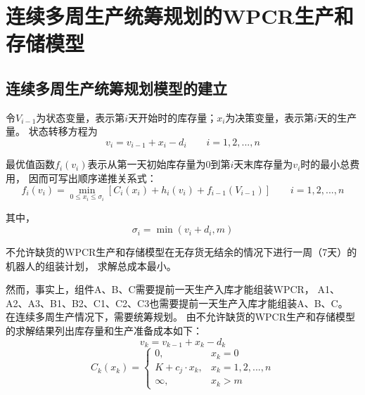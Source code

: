 %
%
%
%
%

\chapter{连续多周生产统筹规划的WPCR生产和存储模型}

\section{连续多周生产统筹规划模型的建立}

令$V_{i-1}$为状态变量，表示第$i$天开始时的库存量；$x_i$为决策变量，表示第$i$天的生产量。
状态转移方程为
\begin{equation*}
    v_i=v_{i-1}+x_i-d_i \qquad i=1,2,...,n
\end{equation*}

最优值函数$f_i(v_i)$表示从第一天初始库存量为$0$到第$i$天末库存量为$v_i$时的最小总费用，
因而可写出顺序递推关系式\cite{韩中庚2007实用运筹学模型}：
\begin{equation}
    f_i(v_i)=\mathop{\min}_{0\leq x_i \leq \sigma_i}[C_i(x_i)+h_i(v_i)+f_{i-1}(V_{i-1})] \qquad i=1,2,...,n
\end{equation}

其中，
\begin{equation}
    \sigma_i=\min(v_i+d_i,m)
\end{equation}

不允许缺货的WPCR生产和存储模型在无存货无结余的情况下进行一周（7天）的机器人的组装计划，
求解总成本最小。

然而，事实上，组件A、B、C需要提前一天生产入库才能组装WPCR，
A1、A2、A3、B1、B2、C1、C2、C3也需要提前一天生产入库才能组装A、B、C。
在连续多周生产情况下，需要统筹规划。
由不允许缺货的WPCR生产和存储模型的求解结果列出库存量和生产准备成本如下：
\begin{equation}
    v_k=v_{k-1}+x_k-d_k
\end{equation}
\begin{equation}
    C_k(x_k)=\begin{cases}
        0, & x_k=0 \\
        K+c_j \cdot x_k, & x_k=1,2,...,n \\
        \infty, & x_k > m
    \end{cases}
\end{equation}

